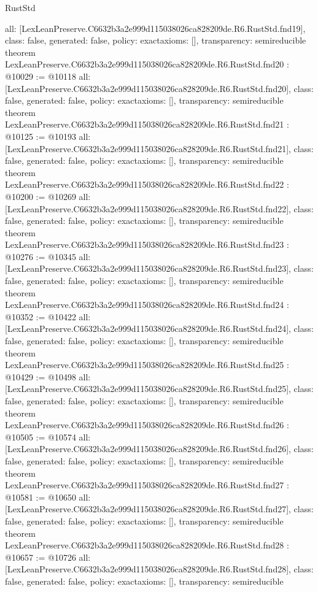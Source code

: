 \begin{lexlean}{RustStd}
\begin{coremodule}
{  all: [LexLeanPreserve.C6632b3a2e999d115038026ca828209de.R6.RustStd.fnd19],
  class: false,
  generated: false,
  policy: exact{axioms: []},
  transparency: semireducible
}
theorem LexLeanPreserve.C6632b3a2e999d115038026ca828209de.R6.RustStd.fnd20 : @10029 := @10118 {
  all: [LexLeanPreserve.C6632b3a2e999d115038026ca828209de.R6.RustStd.fnd20],
  class: false,
  generated: false,
  policy: exact{axioms: []},
  transparency: semireducible
}
theorem LexLeanPreserve.C6632b3a2e999d115038026ca828209de.R6.RustStd.fnd21 : @10125 := @10193 {
  all: [LexLeanPreserve.C6632b3a2e999d115038026ca828209de.R6.RustStd.fnd21],
  class: false,
  generated: false,
  policy: exact{axioms: []},
  transparency: semireducible
}
theorem LexLeanPreserve.C6632b3a2e999d115038026ca828209de.R6.RustStd.fnd22 : @10200 := @10269 {
  all: [LexLeanPreserve.C6632b3a2e999d115038026ca828209de.R6.RustStd.fnd22],
  class: false,
  generated: false,
  policy: exact{axioms: []},
  transparency: semireducible
}
theorem LexLeanPreserve.C6632b3a2e999d115038026ca828209de.R6.RustStd.fnd23 : @10276 := @10345 {
  all: [LexLeanPreserve.C6632b3a2e999d115038026ca828209de.R6.RustStd.fnd23],
  class: false,
  generated: false,
  policy: exact{axioms: []},
  transparency: semireducible
}
theorem LexLeanPreserve.C6632b3a2e999d115038026ca828209de.R6.RustStd.fnd24 : @10352 := @10422 {
  all: [LexLeanPreserve.C6632b3a2e999d115038026ca828209de.R6.RustStd.fnd24],
  class: false,
  generated: false,
  policy: exact{axioms: []},
  transparency: semireducible
}
theorem LexLeanPreserve.C6632b3a2e999d115038026ca828209de.R6.RustStd.fnd25 : @10429 := @10498 {
  all: [LexLeanPreserve.C6632b3a2e999d115038026ca828209de.R6.RustStd.fnd25],
  class: false,
  generated: false,
  policy: exact{axioms: []},
  transparency: semireducible
}
theorem LexLeanPreserve.C6632b3a2e999d115038026ca828209de.R6.RustStd.fnd26 : @10505 := @10574 {
  all: [LexLeanPreserve.C6632b3a2e999d115038026ca828209de.R6.RustStd.fnd26],
  class: false,
  generated: false,
  policy: exact{axioms: []},
  transparency: semireducible
}
theorem LexLeanPreserve.C6632b3a2e999d115038026ca828209de.R6.RustStd.fnd27 : @10581 := @10650 {
  all: [LexLeanPreserve.C6632b3a2e999d115038026ca828209de.R6.RustStd.fnd27],
  class: false,
  generated: false,
  policy: exact{axioms: []},
  transparency: semireducible
}
theorem LexLeanPreserve.C6632b3a2e999d115038026ca828209de.R6.RustStd.fnd28 : @10657 := @10726 {
  all: [LexLeanPreserve.C6632b3a2e999d115038026ca828209de.R6.RustStd.fnd28],
  class: false,
  generated: false,
  policy: exact{axioms: []},
  transparency: semireducible
}
\end{coremodule}
\end{lexlean}
